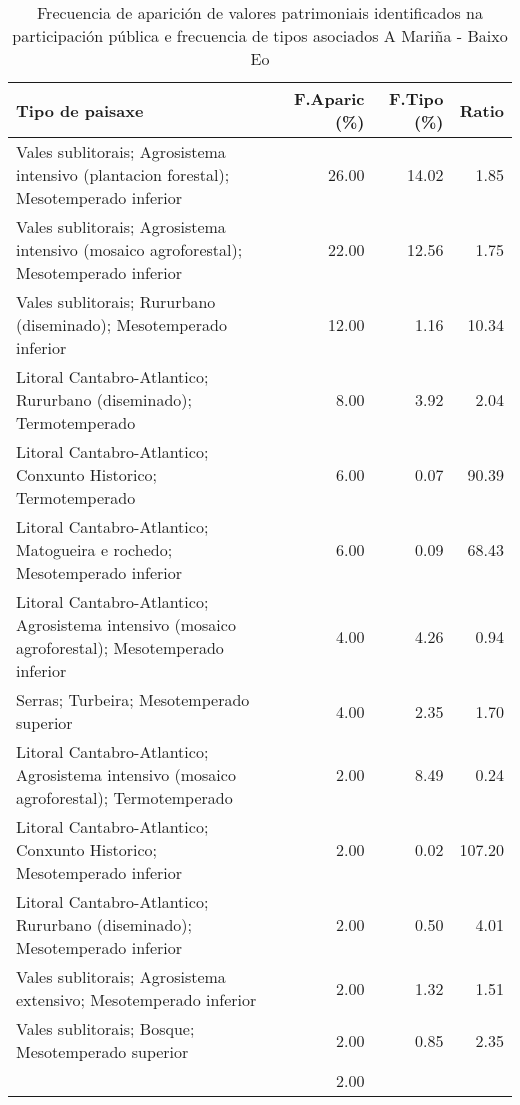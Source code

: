 \begin{table}[p]
\centering
\caption{Frecuencia de aparición de valores patrimoniais identificados na participación pública e frecuencia de tipos asociados A Mariña - Baixo Eo} 
\label{vsixotpat2}
\begin{tabular}{lrrr}
  \hline
Tipo de paisaxe & F.Aparic (\%) & F.Tipo (\%) & Ratio \\ 
  \hline
Vales sublitorais; Agrosistema intensivo (plantacion forestal); Mesotemperado inferior & 26.00 & 14.02 & 1.85 \\ 
  Vales sublitorais; Agrosistema intensivo (mosaico agroforestal); Mesotemperado inferior & 22.00 & 12.56 & 1.75 \\ 
  Vales sublitorais; Rururbano (diseminado); Mesotemperado inferior & 12.00 & 1.16 & 10.34 \\ 
  Litoral Cantabro-Atlantico; Rururbano (diseminado); Termotemperado & 8.00 & 3.92 & 2.04 \\ 
  Litoral Cantabro-Atlantico; Conxunto Historico; Termotemperado & 6.00 & 0.07 & 90.39 \\ 
  Litoral Cantabro-Atlantico; Matogueira e rochedo; Mesotemperado inferior & 6.00 & 0.09 & 68.43 \\ 
  Litoral Cantabro-Atlantico; Agrosistema intensivo (mosaico agroforestal); Mesotemperado inferior & 4.00 & 4.26 & 0.94 \\ 
  Serras; Turbeira; Mesotemperado superior & 4.00 & 2.35 & 1.70 \\ 
  Litoral Cantabro-Atlantico; Agrosistema intensivo (mosaico agroforestal); Termotemperado & 2.00 & 8.49 & 0.24 \\ 
  Litoral Cantabro-Atlantico; Conxunto Historico; Mesotemperado inferior & 2.00 & 0.02 & 107.20 \\ 
  Litoral Cantabro-Atlantico; Rururbano (diseminado); Mesotemperado inferior & 2.00 & 0.50 & 4.01 \\ 
  Vales sublitorais; Agrosistema extensivo; Mesotemperado inferior & 2.00 & 1.32 & 1.51 \\ 
  Vales sublitorais; Bosque; Mesotemperado superior & 2.00 & 0.85 & 2.35 \\ 
   & 2.00 &  &  \\ 
   \hline
\end{tabular}
\end{table}
